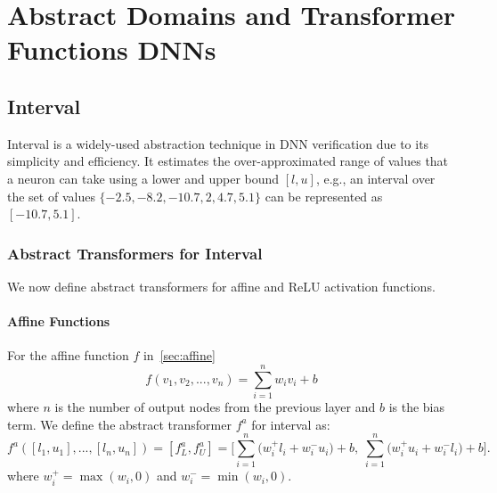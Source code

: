 \documentclass[oneside,11pt,dvipsnames]{book}
\numberwithin{equation}{section}
\theoremstyle{definition}
\theoremstyle{remark}
\begin{document}
\section{Abstract Domains and Transformer Functions DNNs}

\subsection{Interval}\label{sec:interval-abstraction}

Interval is a widely-used abstraction technique in DNN verification due to its simplicity and efficiency. It estimates the over-approximated range of values that a neuron can take using a lower and upper bound $[l, u]$, e.g., an interval over the set of values $\{-2.5, -8.2, -10.7, 2, 4.7, 5.1\}$ can be represented as $[-10.7, 5.1]$.

\subsubsection{Abstract Transformers for Interval}

We now define abstract transformers for affine and ReLU activation functions.

\paragraph{Affine Functions} For the affine function \(f\) in~\autoref{sec:affine}
\[f(v_1, v_2, ...,v_n) = \sum_{i=1}^{n} w_i v_i + b\]
where $n$ is the number of output nodes from the previous layer and \(b\) is the bias term. We define the abstract transformer \(f^a\) for interval as:
\[
f^{a}([l_1, u_1],..., [l_n, u_n]) = [f^a_L, f^a_U] = 
\Bigg[\sum_{i=1}^{n}\big(w_i^{+} l_i + w_i^{-} u_i\big) + b,\; \sum_{i=1}^{n}\big(w_i^{+} u_i + w_i^{-} l_i\big) + b\Bigg].
\]
where \(w_i^{+} = \max(w_i, 0)\) and \(w_i^{-} = \min(w_i, 0)\).
\end{document}
